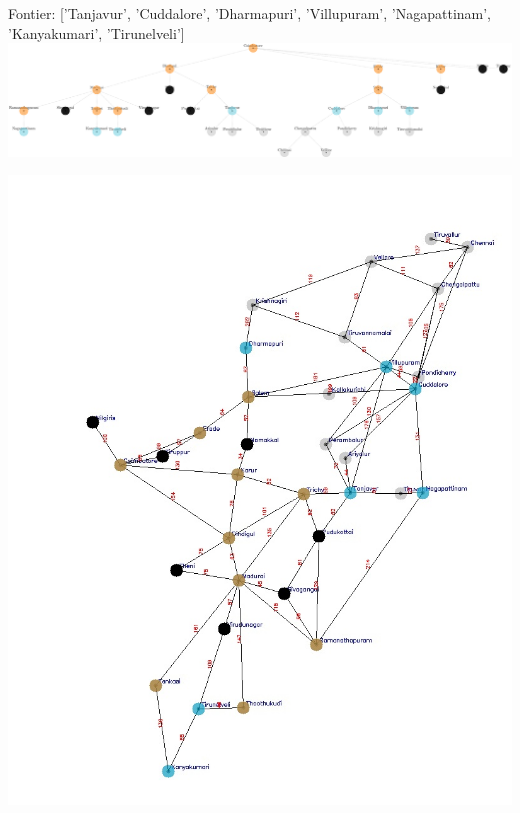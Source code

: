 \documentclass[xcolor=table]{beamer}
\begin{document}
\begin{frame}
  { \tiny Fontier: ['Tanjavur', 'Cuddalore', 'Dharmapuri', 'Villupuram', 'Nagapattinam', 'Kanyakumari', 'Tirunelveli']}
  \includegraphics[width=1\textwidth]{../BFSNodes/26-1.png}
  \begin{center}
    \includegraphics[height=0.6\textheight]{../BFSoutput/tamilBFS24.jpg}
  \end{center}
\end{frame}
\end{document}
